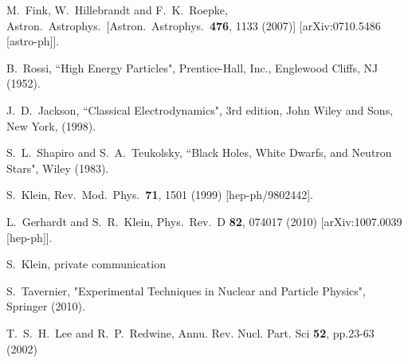 \documentclass[twocolumn,preprintnumbers,amsmath,amssymb,prl, superscriptaddress]{revtex4}
\begin{document}
\begin{thebibliography}{99}
  M.~Fink, W.~Hillebrandt and F.~K.~Roepke,
  Astron.\ Astrophys.\
  [Astron.\ Astrophys.\  {\bf 476}, 1133 (2007)]
  [arXiv:0710.5486 [astro-ph]].


B.~Rossi, ``High Energy Particles", Prentice-Hall, Inc., Englewood Cliffs, NJ (1952).

J.~D.~Jackson, ``Classical Electrodynamics", 3rd edition, John Wiley and Sons, New
York, (1998).

S.~L.~Shapiro and S.~A.~Teukolsky, ``Black Holes, White Dwarfs, and Neutron Stars", Wiley (1983).

  S.~Klein,
  Rev.\ Mod.\ Phys.\  {\bf 71}, 1501 (1999)
  [hep-ph/9802442].

  L.~Gerhardt and S.~R.~Klein,
  Phys.\ Rev.\ D {\bf 82}, 074017 (2010)
  [arXiv:1007.0039 [hep-ph]].

S.~Klein, private communication

S.~Tavernier, "Experimental Techniques in Nuclear and Particle Physics", Springer (2010).

T.~S.~H.~Lee and R.~P.~Redwine,
 Annu. Rev. Nucl. Part. Sci {\bf 52}, pp.23-63 (2002)


\end{thebibliography}
\end{document}
